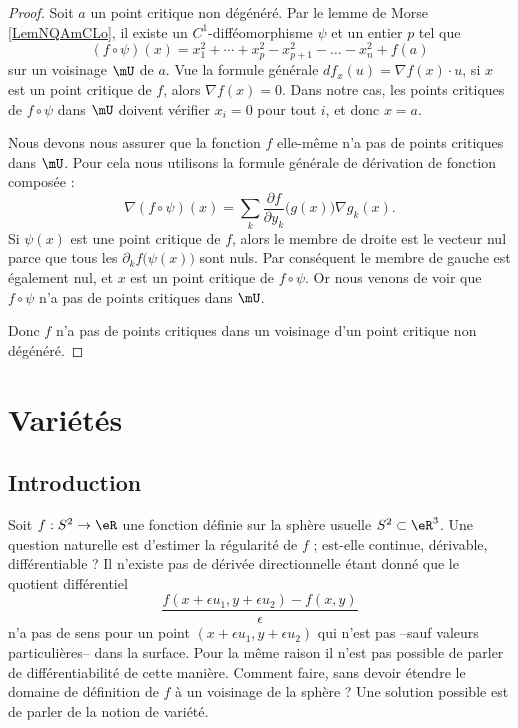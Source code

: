 \begin{proof}
    Soit \( a\) un point critique non dégénéré. Par le lemme de Morse \ref{LemNQAmCLo}, il existe un \( C^1\)-difféomorphisme \( \psi\) et un entier \( p\) tel que
    \begin{equation}
        (f\circ \psi)(x)=x_1^2+\cdots +x_p^2-x_{p+1}^2-\ldots -x_n^2+f(a)
    \end{equation}
    sur un voisinage \( \mU\) de \( a\). Vue la formule générale \( df_x(u)=\nabla f(x)\cdot u\), si \( x\) est un point critique de \( f\), alors \( \nabla f(x)=0\). Dans notre cas, les points critiques de \( f\circ \psi\) dans \( \mU\) doivent vérifier \( x_i=0\) pour tout \( i\), et donc \( x=a\).

    Nous devons nous assurer que la fonction \( f\) elle-même n'a pas de points critiques dans \( \mU\). Pour cela nous utilisons la formule générale de dérivation de fonction composée :
    \begin{equation}
        \nabla(f\circ\psi)(x)=\sum_k \frac{ \partial f }{ \partial y_k }\big( g(x) \big)\nabla g_k(x).
    \end{equation}
    Si \( \psi(x)\) est une point critique de \( f\), alors le membre de droite est le vecteur nul parce que tous les \( \partial_kf\big( \psi(x) \big)\) sont nuls. Par conséquent le membre de gauche est également nul, et \( x\) est un point critique de \( f\circ\psi\). Or nous venons de voir que \( f\circ\psi\) n'a pas de points critiques dans \( \mU\).

    Donc \( f\) n'a pas de points critiques dans un voisinage d'un point critique non dégénéré.
\end{proof}

\section{Variétés}

\subsection{Introduction}
Soit $f : S^2 \to \eR$ une fonction définie sur la sphère usuelle
$S^2 \subset \eR^3$. Une question naturelle est d'estimer la
régularité de $f$ ; est-elle continue, dérivable, différentiable ? Il
n'existe pas de dérivée directionnelle étant donné que le quotient
différentiel
\begin{equation*}
  \frac{f(x + \epsilon u_1 ,y + \epsilon u_2) - f(x,y)}{\epsilon}
\end{equation*}
n'a pas de sens pour un point $(x + \epsilon u_1 ,y + \epsilon u_2)$
qui n'est pas --sauf valeurs particulières-- dans la surface. Pour la
même raison il n'est pas possible de parler de différentiabilité de
cette manière. Comment faire, sans devoir étendre le domaine de
définition de $f$ à un voisinage de la sphère ? Une solution possible
est de parler de la notion de variété.

